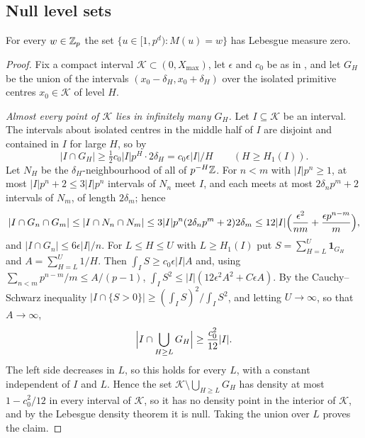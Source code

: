 \documentclass[11pt]{article}
\begin{document}
\subsection{Null level sets}

\begin{proposition}\label{prop:nulllevel}
For every $w\in\mathbb Z_p$ the set $\{u\in[1,p^d):M(u)=w\}$ has Lebesgue measure zero.
\end{proposition}

\begin{proof}
Fix a compact interval $\mathcal K\subset(0,X_{\max})$, let $\epsilon$ and $c_0$ be as in
, and let $G_H$ be the union of the intervals $(x_0-\delta_H,x_0+\delta_H)$ over the
isolated primitive centres $x_0\in\mathcal K$ of level $H$.

\emph{Almost every point of $\mathcal K$ lies in infinitely many $G_H$.} Let $I\subseteq\mathcal K$ be an
interval. The intervals about isolated centres in the middle half of $I$ are disjoint and contained in
$I$ for large $H$, so by 
\[
|I\cap G_H|\ge\tfrac12c_0|I|p^H\cdot2\delta_H=c_0\epsilon|I|/H\qquad(H\ge H_1(I)).
\]
Let $N_H$ be the $\delta_H$-neighbourhood of all of $p^{-H}\mathbb Z$. For $n<m$ with $|I|p^n\ge1$, at most
$|I|p^n+2\le3|I|p^n$ intervals of $N_n$ meet $I$, and each meets at most $2\delta_np^m+2$ intervals of
$N_m$, of length $2\delta_m$; hence
\[
|I\cap G_n\cap G_m|\le|I\cap N_n\cap N_m|\le3|I|p^n(2\delta_np^m+2)2\delta_m
\le12|I|\Bigl(\frac{\epsilon^2}{nm}+\frac{\epsilon p^{n-m}}m\Bigr),
\]
and $|I\cap G_n|\le6\epsilon|I|/n$. For $L\le H\le U$ with $L\ge H_1(I)$ put $S=\sum_{H=L}^U\mathbf1_{G_H}$
and $A=\sum_{H=L}^U1/H$. Then $\int_IS\ge c_0\epsilon|I|A$ and, using $\sum_{n<m}p^{n-m}/m\le A/(p-1)$,
$\int_IS^2\le|I|(12\epsilon^2A^2+C\epsilon A)$. By the Cauchy--Schwarz inequality
$|I\cap\{S>0\}|\ge(\int_IS)^2/\int_IS^2$, and letting $U\to\infty$, so that $A\to\infty$,
\[
\Bigl|I\cap\bigcup_{H\ge L}G_H\Bigr|\ge\frac{c_0^2}{12}|I| .
\]
The left side decreases in $L$, so this holds for every $L$, with a constant independent of $I$ and $L$.
Hence the set $\mathcal K\setminus\bigcup_{H\ge L}G_H$ has density at most $1-c_0^2/12$ in every interval
of $\mathcal K$, so it has no density point in the interior of $\mathcal K$, and by the Lebesgue density
theorem it is null. Taking the union over $L$ proves the claim.


\end{proof}
\end{document}
